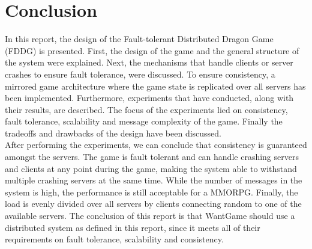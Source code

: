 \section{Conclusion}
In this report, the design of the Fault-tolerant Distributed Dragon Game (FDDG) is presented. First, the design of the game and the general structure of the system were explained. Next, the mechanisms that handle clients or server crashes to ensure fault tolerance, were discussed. To ensure consistency, a mirrored game architecture where the game state is replicated over all servers has been implemented. Furthermore, experiments that have conducted, along with their results, are described. The focus of the experiments lied on consistency, fault tolerance, scalability and message complexity of the game. Finally the tradeoffs and drawbacks of the design have been discussed.\\
After performing the experiments, we can conclude that consistency is guaranteed amongst the servers. The game is fault tolerant and can handle crashing servers and clients at any point during the game, making the system able to withstand multiple crashing servers at the same time. While the number of messages in the system is high, the performance is still acceptable for a MMORPG. Finally, the load is evenly divided over all servers by clients connecting random to one of the available servers.
The conclusion of this report is that WantGame should use a distributed system as defined in this report, since it meets all of their requirements on fault tolerance, scalability and consistency.